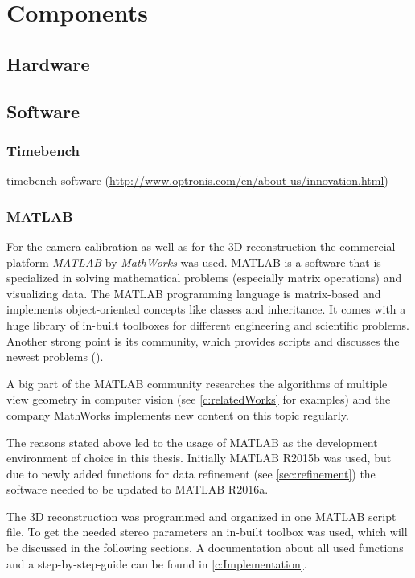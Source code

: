 \chapter{Components} \label{c:Components}
\section{Hardware} \label{sec:Hardware}

\section{Software} \label{sec:Software}

\subsection{Timebench} \label{ssec:Timebench}
timebench software (\url{http://www.optronis.com/en/about-us/innovation.html})

\subsection{MATLAB} \label{ssec:Matlab}
For the camera calibration as well as for the 3D reconstruction the commercial platform \textit{MATLAB} by \textit{MathWorks} was used. MATLAB is a software that is specialized in solving mathematical problems (especially matrix operations) and visualizing data. The MATLAB programming language is matrix-based and implements object-oriented concepts like classes and inheritance. It comes with a huge library of in-built toolboxes for different engineering and scientific problems. Another strong point is its community, which provides scripts and discusses the newest problems (\cite{MathWorks.2016}).

A big part of the MATLAB community researches the algorithms of multiple view geometry in computer vision (see \autoref{c:relatedWorks} for examples) and the company MathWorks implements new content on this topic regularly. 

The reasons stated above led to the usage of MATLAB as the development environment of choice in this thesis. Initially MATLAB R2015b was used, but due to newly added functions for data refinement (see \autoref{sec:refinement}) the software needed to be updated to MATLAB R2016a.
   
The 3D reconstruction was programmed and organized in one MATLAB script file. To get the needed stereo parameters an in-built toolbox was used, which will be discussed in the following sections. A documentation about all used functions and a step-by-step-guide can be found in \autoref{c:Implementation}.

